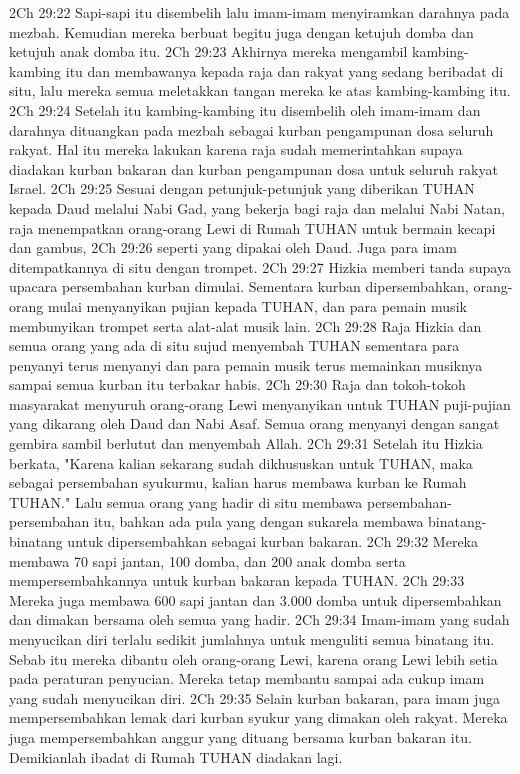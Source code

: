 2Ch 29:22  Sapi-sapi itu disembelih lalu imam-imam menyiramkan darahnya pada mezbah. Kemudian mereka berbuat begitu juga dengan ketujuh domba dan ketujuh anak domba itu.
2Ch 29:23  Akhirnya mereka mengambil kambing-kambing itu dan membawanya kepada raja dan rakyat yang sedang beribadat di situ, lalu mereka semua meletakkan tangan mereka ke atas kambing-kambing itu.
2Ch 29:24  Setelah itu kambing-kambing itu disembelih oleh imam-imam dan darahnya dituangkan pada mezbah sebagai kurban pengampunan dosa seluruh rakyat. Hal itu mereka lakukan karena raja sudah memerintahkan supaya diadakan kurban bakaran dan kurban pengampunan dosa untuk seluruh rakyat Israel.
2Ch 29:25  Sesuai dengan petunjuk-petunjuk yang diberikan TUHAN kepada Daud melalui Nabi Gad, yang bekerja bagi raja dan melalui Nabi Natan, raja menempatkan orang-orang Lewi di Rumah TUHAN untuk bermain kecapi dan gambus,
2Ch 29:26  seperti yang dipakai oleh Daud. Juga para imam ditempatkannya di situ dengan trompet.
2Ch 29:27  Hizkia memberi tanda supaya upacara persembahan kurban dimulai. Sementara kurban dipersembahkan, orang-orang mulai menyanyikan pujian kepada TUHAN, dan para pemain musik membunyikan trompet serta alat-alat musik lain.
2Ch 29:28  Raja Hizkia dan semua orang yang ada di situ sujud menyembah TUHAN sementara para penyanyi terus menyanyi dan para pemain musik terus memainkan musiknya sampai semua kurban itu terbakar habis.
2Ch 29:30  Raja dan tokoh-tokoh masyarakat menyuruh orang-orang Lewi menyanyikan untuk TUHAN puji-pujian yang dikarang oleh Daud dan Nabi Asaf. Semua orang menyanyi dengan sangat gembira sambil berlutut dan menyembah Allah.
2Ch 29:31  Setelah itu Hizkia berkata, "Karena kalian sekarang sudah dikhususkan untuk TUHAN, maka sebagai persembahan syukurmu, kalian harus membawa kurban ke Rumah TUHAN." Lalu semua orang yang hadir di situ membawa persembahan-persembahan itu, bahkan ada pula yang dengan sukarela membawa binatang-binatang untuk dipersembahkan sebagai kurban bakaran.
2Ch 29:32  Mereka membawa 70 sapi jantan, 100 domba, dan 200 anak domba serta mempersembahkannya untuk kurban bakaran kepada TUHAN.
2Ch 29:33  Mereka juga membawa 600 sapi jantan dan 3.000 domba untuk dipersembahkan dan dimakan bersama oleh semua yang hadir.
2Ch 29:34  Imam-imam yang sudah menyucikan diri terlalu sedikit jumlahnya untuk menguliti semua binatang itu. Sebab itu mereka dibantu oleh orang-orang Lewi, karena orang Lewi lebih setia pada peraturan penyucian. Mereka tetap membantu sampai ada cukup imam yang sudah menyucikan diri.
2Ch 29:35  Selain kurban bakaran, para imam juga mempersembahkan lemak dari kurban syukur yang dimakan oleh rakyat. Mereka juga mempersembahkan anggur yang dituang bersama kurban bakaran itu. Demikianlah ibadat di Rumah TUHAN diadakan lagi.
